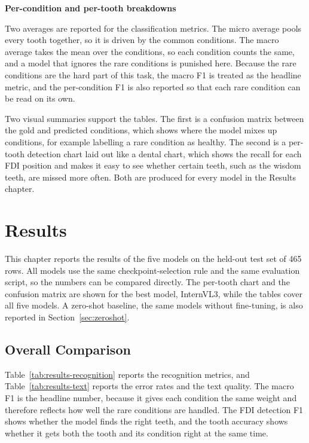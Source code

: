 \documentclass[a4paper,12pt]{report}
\newcommand{\minisection}[1]{%
  \vspace{1ex}
  \noindent\textbf{#1}\par
  \vspace{0.5ex}
}
\begin{document}
\minisection{Per-condition and per-tooth breakdowns}

Two averages are reported for the classification metrics. The micro average pools every tooth together, so it is driven by the common conditions. The macro average takes the mean over the conditions, so each condition counts the same, and a model that ignores the rare conditions is punished here. Because the rare conditions are the hard part of this task, the macro F1 is treated as the headline metric, and the per-condition F1 is also reported so that each rare condition can be read on its own.

Two visual summaries support the tables. The first is a confusion matrix between the gold and predicted conditions, which shows where the model mixes up conditions, for example labelling a rare condition as healthy. The second is a per-tooth detection chart laid out like a dental chart, which shows the recall for each FDI position and makes it easy to see whether certain teeth, such as the wisdom teeth, are missed more often. Both are produced for every model in the Results chapter.

\chapter{Results}

This chapter reports the results of the five models on the held-out test set of 465 rows. All models use the same checkpoint-selection rule and the same evaluation script, so the numbers can be compared directly. The per-tooth chart and the confusion matrix are shown for the best model, InternVL3, while the tables cover all five models. A zero-shot baseline, the same models without fine-tuning, is also reported in Section~\ref{sec:zeroshot}.

\section{Overall Comparison}

Table~\ref{tab:results-recognition} reports the recognition metrics, and Table~\ref{tab:results-text} reports the error rates and the text quality. The macro F1 is the headline number, because it gives each condition the same weight and therefore reflects how well the rare conditions are handled. The FDI detection F1 shows whether the model finds the right teeth, and the tooth accuracy shows whether it gets both the tooth and its condition right at the same time.
\end{document}
